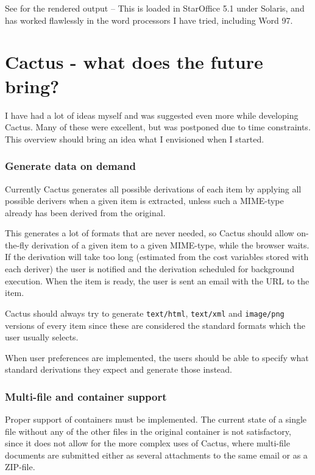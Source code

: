 

See  for the rendered output -- This is loaded in
  StarOffice 5.1 under Solaris, and has worked flawlessly in the word
  processors I have tried, including Word 97.

\chapter{Cactus - what does the future bring?}

I have had a lot of ideas myself and was suggested even more while
developing Cactus.  Many of these were excellent, but was postponed
due to time constraints.  This overview should bring an idea what I
envisioned when I started.

\subsection*{Generate data on demand}

Currently Cactus generates all possible derivations of each item by
applying all possible derivers when a given item is extracted, unless
such a MIME-type already has been derived from the original.

This generates a lot of formats that are never needed, so Cactus
should allow on-the-fly derivation of a given item to a given
MIME-type, while the browser waits.  If the derivation will take too
long (estimated from the cost variables stored with each deriver) the
user is notified and the derivation scheduled for background
execution.  When the item is ready, the user is sent an email with the
URL to the item.

Cactus should always try to generate \texttt{text/html},
\texttt{text/xml} and \texttt{image/png} versions of every item since
these are considered the standard formats which the user usually
selects.

When user preferences are implemented, the users should be able to
specify what standard derivations they expect and generate those
instead.

\subsection*{Multi-file and container support}

Proper support of containers must be implemented.  The current state
of a single file without any of the other files in the original
container is not satisfactory, since it does not allow for the more
complex uses of Cactus, where multi-file documents are submitted
either as several attachments to the same email or as a ZIP-file.

